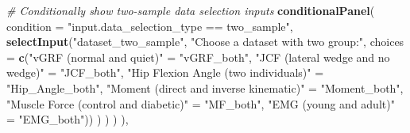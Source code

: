 \documentclass[
]{article}
\newenvironment{Shaded}{\begin{snugshade}}{\end{snugshade}}
\newcommand{\AttributeTok}[1]{\textcolor[rgb]{0.13,0.29,0.53}{#1}}
\newcommand{\CommentTok}[1]{\textcolor[rgb]{0.56,0.35,0.01}{\textit{#1}}}
\newcommand{\FunctionTok}[1]{\textcolor[rgb]{0.13,0.29,0.53}{\textbf{#1}}}
\newcommand{\NormalTok}[1]{#1}
\newcommand{\OtherTok}[1]{\textcolor[rgb]{0.56,0.35,0.01}{#1}}
\newcommand{\StringTok}[1]{\textcolor[rgb]{0.31,0.60,0.02}{#1}}
\begin{document}
\begin{Shaded}
\begin{Highlighting}[]
                      \CommentTok{\# Conditionally show two{-}sample data selection inputs}
                      \FunctionTok{conditionalPanel}\NormalTok{(}
                        \AttributeTok{condition =} \StringTok{"input.data\_selection\_type == \textquotesingle{}two\_sample\textquotesingle{}"}\NormalTok{,}
                        \FunctionTok{selectInput}\NormalTok{(}\StringTok{"dataset\_two\_sample"}\NormalTok{, }\StringTok{"Choose a dataset with two group:"}\NormalTok{,}
                                    \AttributeTok{choices =} \FunctionTok{c}\NormalTok{(}\StringTok{"vGRF (normal and quiet)"} \OtherTok{=} \StringTok{"vGRF\_both"}\NormalTok{,}
                                                \StringTok{"JCF (lateral wedge and no wedge)"} \OtherTok{=} \StringTok{"JCF\_both"}\NormalTok{,}
                                                \StringTok{"Hip Flexion Angle (two individuals)"} \OtherTok{=} \StringTok{"Hip\_Angle\_both"}\NormalTok{,}
                                                \StringTok{"Moment (direct and inverse kinematic)"} \OtherTok{=} \StringTok{"Moment\_both"}\NormalTok{,}
                                                \StringTok{"Muscle Force (control and diabetic)"} \OtherTok{=} \StringTok{"MF\_both"}\NormalTok{,}
                                                \StringTok{"EMG (young and adult)"} \OtherTok{=} \StringTok{"EMG\_both"}\NormalTok{))}
\NormalTok{                      )}
\NormalTok{               )}
\NormalTok{             )}
\NormalTok{    ),}
    

\end{Highlighting}
\end{Shaded}
\end{document}
